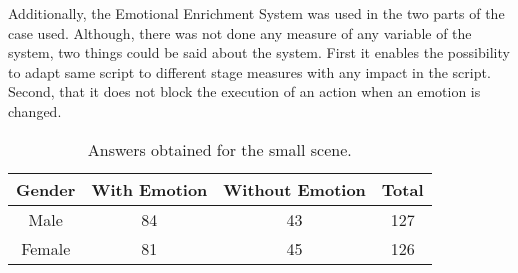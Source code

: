 Additionally, the Emotional Enrichment System was used in the two parts of the case used. Although, there was not done any measure of any variable of the system, two things could be said about the system. First it enables the possibility to adapt same script to different stage measures with any impact in the script.  Second, that it does not block the execution of an action when an emotion is changed.
\begin{table}
\centering
		\caption{Answers obtained for the small scene.}		
		\label{table:preference_selection}
			\begin{tabular}{|c|c|c|c|}
			\hline
			\textbf{Gender}&\textbf{With Emotion}&\textbf{Without Emotion}&\textbf{Total}\\
			\hline
			Male & 84 & 43 & 127\\
			\hline
			Female & 81 & 45 & 126\\
			\hline
			\end{tabular}
\end{table}

